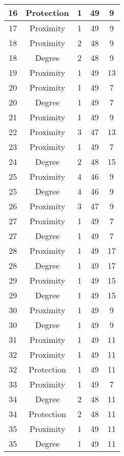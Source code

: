 \documentclass[results.tex]{subfiles}
\begin{document}
\begin{center}
\begin{tabular}{| c || c | c | c | c |}
    \hline
    16 & Protection & 1 & 49 & 9 \\ 
    \hline
    17 & Proximity & 1 & 49 & 9 \\ 
    \hline
    18 & Proximity & 2 & 48 & 9 \\ 
    \hline
    18 & Degree & 2 & 48 & 9 \\ 
    \hline
    19 & Proximity & 1 & 49 & 13 \\ 
    \hline
    20 & Proximity & 1 & 49 & 7 \\ 
    \hline
    20 & Degree & 1 & 49 & 7 \\ 
    \hline
    21 & Proximity & 1 & 49 & 9 \\ 
    \hline
    22 & Proximity & 3 & 47 & 13 \\ 
    \hline
    23 & Proximity & 1 & 49 & 7 \\ 
    \hline
    24 & Degree & 2 & 48 & 15 \\ 
    \hline
    25 & Proximity & 4 & 46 & 9 \\ 
    \hline
    25 & Degree & 4 & 46 & 9 \\ 
    \hline
    26 & Proximity & 3 & 47 & 9 \\ 
    \hline
    27 & Proximity & 1 & 49 & 7 \\ 
    \hline
    27 & Degree & 1 & 49 & 7 \\ 
    \hline
    28 & Proximity & 1 & 49 & 17 \\ 
    \hline
    28 & Degree & 1 & 49 & 17 \\ 
    \hline
    29 & Proximity & 1 & 49 & 15 \\ 
    \hline
    29 & Degree & 1 & 49 & 15 \\ 
    \hline
    30 & Proximity & 1 & 49 & 9 \\ 
    \hline
    30 & Degree & 1 & 49 & 9 \\ 
    \hline
    31 & Proximity & 1 & 49 & 11 \\ 
    \hline
    32 & Proximity & 1 & 49 & 11 \\ 
    \hline
    32 & Protection & 1 & 49 & 11 \\ 
    \hline
    33 & Proximity & 1 & 49 & 7 \\ 
    \hline
    34 & Degree & 2 & 48 & 11 \\ 
    \hline
    34 & Protection & 2 & 48 & 11 \\ 
    \hline
    35 & Proximity & 1 & 49 & 11 \\ 
    \hline
    35 & Degree & 1 & 49 & 11 \\ 
    \hline

\end{tabular}
\end{center}
\end{document}
